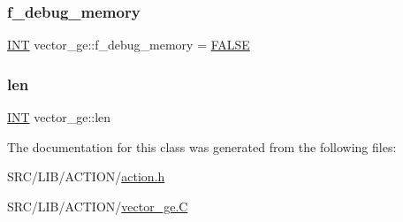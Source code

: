 \subsubsection{\texorpdfstring{f\+\_\+debug\+\_\+memory}{f\_debug\_memory}}
{\footnotesize\ttfamily \mbox{\hyperlink{galois_8h_a09fddde158a3a20bd2dcadb609de11dc}{I\+NT}} vector\+\_\+ge\+::f\+\_\+debug\+\_\+memory = \mbox{\hyperlink{nauty_8h_aa93f0eb578d23995850d61f7d61c55c1}{F\+A\+L\+SE}}\hspace{0.3cm}{\ttfamily [static]}}

\mbox{\label{classvector__ge_abdbd74327212540bfa3f08b56e40543b}} 
\subsubsection{\texorpdfstring{len}{len}}
{\footnotesize\ttfamily \mbox{\hyperlink{galois_8h_a09fddde158a3a20bd2dcadb609de11dc}{I\+NT}} vector\+\_\+ge\+::len}



The documentation for this class was generated from the following files\+:\begin{DoxyCompactItemize}
\item 
S\+R\+C/\+L\+I\+B/\+A\+C\+T\+I\+O\+N/\mbox{\hyperlink{action_8h}{action.\+h}}\item 
S\+R\+C/\+L\+I\+B/\+A\+C\+T\+I\+O\+N/\mbox{\hyperlink{vector__ge_8_c}{vector\+\_\+ge.\+C}}\end{DoxyCompactItemize}
